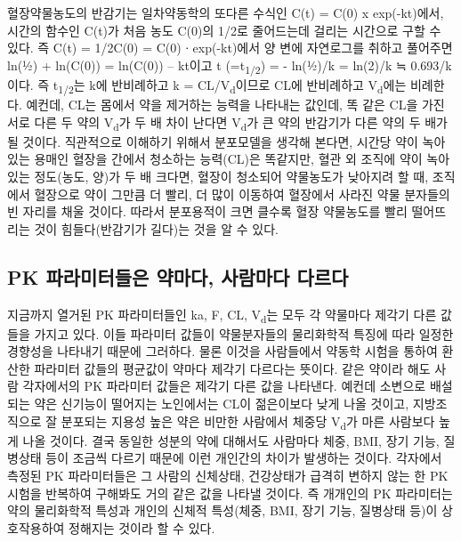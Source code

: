 \documentclass[
  11pt,
  krantz2, a4paper, twoside]{krantz}
\begin{document}
혈장약물농도의 반감기는 일차약동학의 또다른 수식인 C(t) = C(0) x
exp(-kt)에서, 시간의 함수인 C(t)가 처음 농도 C(0)의 1/2로 줄어드는데
걸리는 시간으로 구할 수 있다. 즉 C(t) = 1/2C(0) = C(0) ∙ exp(-kt)에서 양
변에 자연로그를 취하고 풀어주면 ln(½) + ln(C(0)) = ln(C(0)) -- kt이고 t
(=t\textsubscript{1/2}) = - ln(½)/k = ln(2)/k ≒ 0.693/k이다. 즉 t\textsubscript{1/2}는 k에
반비례하고 k = CL/V\textsubscript{d}이므로 CL에 반비례하고 V\textsubscript{d}에는 비례한다. 예컨데,
CL는 몸에서 약을 제거하는 능력을 나타내는 값인데, 똑 같은 CL을 가진 서로
다른 두 약의 V\textsubscript{d}가 두 배 차이 난다면 V\textsubscript{d}가 큰 약의 반감기가 다른 약의
두 배가 될 것이다. 직관적으로 이해하기 위해서 분포모델을 생각해 본다면,
시간당 약이 녹아있는 용매인 혈장을 간에서 청소하는 능력(CL)은 똑같지만,
혈관 외 조직에 약이 녹아있는 정도(농도, 양)가 두 배 크다면, 혈장이
청소되어 약물농도가 낮아지려 할 때, 조직에서 혈장으로 약이 그만큼 더
빨리, 더 많이 이동하여 혈장에서 사라진 약물 분자들의 빈 자리를 채울
것이다. 따라서 분포용적이 크면 클수록 혈장 약물농도를 빨리 떨어뜨리는
것이 힘들다(반감기가 길다)는 것을 알 수 있다.

\hypertarget{pk-uxd30cuxb77cuxbbf8uxd130uxb4e4uxc740-uxc57duxb9c8uxb2e4-uxc0acuxb78cuxb9c8uxb2e4-uxb2e4uxb974uxb2e4}{%
\subsection{PK 파라미터들은 약마다, 사람마다 다르다}\label{pk-uxd30cuxb77cuxbbf8uxd130uxb4e4uxc740-uxc57duxb9c8uxb2e4-uxc0acuxb78cuxb9c8uxb2e4-uxb2e4uxb974uxb2e4}}

지금까지 열거된 PK 파라미터들인 ka, F, CL, V\textsubscript{d}는 모두 각 약물마다
제각기 다른 값들을 가지고 있다. 이들 파라미터 값들이 약물분자들의
물리화학적 특징에 따라 일정한 경향성을 나타내기 때문에 그러하다. 물론
이것을 사람들에서 약동학 시험을 통하여 환산한 파라미터 값들의 평균값이
약마다 제각기 다르다는 뜻이다. 같은 약이라 해도 사람 각자에서의 PK
파라미터 값들은 제각기 다른 값을 나타낸다. 예컨데 소변으로 배설되는 약은
신기능이 떨어지는 노인에서는 CL이 젊은이보다 낮게 나올 것이고,
지방조직으로 잘 분포되는 지용성 높은 약은 비만한 사람에서 체중당 V\textsubscript{d}가
마른 사람보다 높게 나올 것이다. 결국 동일한 성분의 약에 대해서도
사람마다 체중, BMI, 장기 기능, 질병상태 등이 조금씩 다르기 때문에 이런
개인간의 차이가 발생하는 것이다. 각자에서 측정된 PK 파라미터들은 그
사람의 신체상태, 건강상태가 급격히 변하지 않는 한 PK 시험을 반복하여
구해봐도 거의 같은 값을 나타낼 것이다. 즉 개개인의 PK 파라미터는 약의
물리화학적 특성과 개인의 신체적 특성(체중, BMI, 장기 기능, 질병상태
등)이 상호작용하여 정해지는 것이라 할 수 있다.
\end{document}
